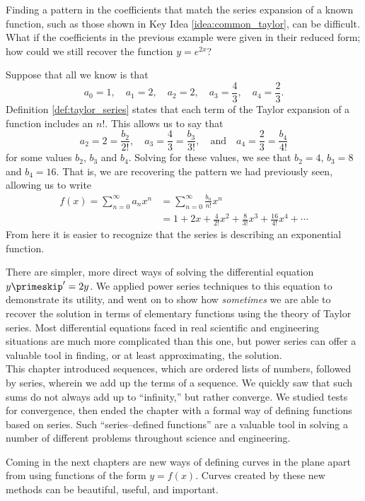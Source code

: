 Finding a pattern in the coefficients that match the series expansion of a known function, such as those shown in Key Idea \ref{idea:common_taylor}, can be difficult. What if the coefficients in the previous example were given in their reduced form; how could we still recover the function $y=e^{2x}$?

Suppose that all we know is that 
$$a_0=1,\quad a_1=2,\quad a_2=2,\quad a_3=\frac43,\quad a_4=\frac23.$$
Definition \ref{def:taylor_series} states that each term of the Taylor expansion of a function includes an $n!$. This allows us to say that
$$a_2=2=\frac{b_2}{2!},\quad a_3 = \frac43=\frac{b_3}{3!},\quad \text{and}\quad a_4 = \frac23=\frac{b_4}{4!}$$
for some values $b_2$, $b_3$ and $b_4$.
Solving for these values, we see that $b_2=4$, $b_3 = 8$ and $b_4=16$. That is, we are recovering the pattern we had previously seen, allowing us to write 
\begin{align*}
f(x) = \sum_{n=0}^\infty a_nx^n &= \sum_{n=0}^\infty \frac{b_n}{n!}x^n \\
			&= 1+2x+ \frac{4}{2!}x^2 + \frac{8}{3!}x^3+\frac{16}{4!}x^4 + \cdots
\end{align*}
From here it is easier to recognize that the series is describing an exponential function.

There are simpler, more direct ways of solving the differential equation $y\primeskip' = 2y$. We applied power series techniques to this equation to demonstrate its utility, and went on to show how \emph{sometimes} we are able to recover the solution in terms of elementary functions using the theory of Taylor series. Most differential equations faced in real scientific and engineering situations are much more complicated than this one, but power series can offer a valuable tool in finding, or at least approximating, the solution.\\

This chapter introduced sequences, which are ordered lists of numbers, followed by series, wherein we add up the terms of a sequence. We quickly saw that such sums do not always add up to ``infinity,'' but rather converge. We studied tests for convergence, then ended the chapter with a formal way of defining functions based on series. Such ``series--defined functions'' are a valuable tool in solving a number of different problems throughout science and engineering. 

Coming in the next chapters are new ways of defining curves in the plane apart from using functions of the form $y=f(x)$. Curves created by these new methods can be beautiful, useful, and important. 





